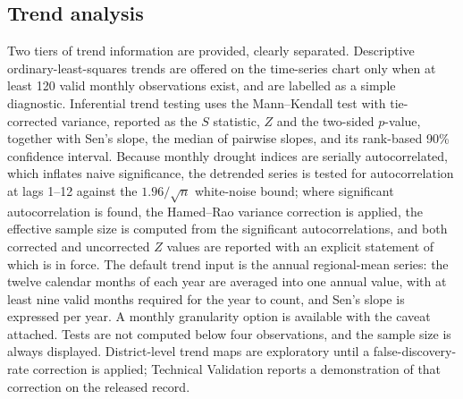 \documentclass[10pt,a4paper]{article}
\begin{document}
\subsection*{Trend analysis}
Two tiers of trend information are provided, clearly separated. Descriptive ordinary-least-squares trends are offered on the time-series chart only when at least 120 valid monthly observations exist, and are labelled as a simple diagnostic. Inferential trend testing uses the Mann--Kendall test\citep{Mann1945,Kendall1975} with tie-corrected variance, reported as the $S$ statistic, $Z$ and the two-sided $p$-value, together with Sen's slope\citep{Sen1968}, the median of pairwise slopes, and its rank-based 90\% confidence interval\citep{Gilbert1987}. Because monthly drought indices are serially autocorrelated, which inflates naive significance, the detrended series is tested for autocorrelation at lags 1--12 against the $1.96/\sqrt{n}$ white-noise bound; where significant autocorrelation is found, the Hamed--Rao variance correction\citep{HamedRao1998} is applied, the effective sample size is computed from the significant autocorrelations, and both corrected and uncorrected $Z$ values are reported with an explicit statement of which is in force. The default trend input is the annual regional-mean series: the twelve calendar months of each year are averaged into one annual value, with at least nine valid months required for the year to count, and Sen's slope is expressed per year. A monthly granularity option is available with the caveat attached. Tests are not computed below four observations, and the sample size is always displayed. District-level trend maps are exploratory until a false-discovery-rate correction is applied; Technical Validation reports a demonstration of that correction on the released record.
\end{document}
